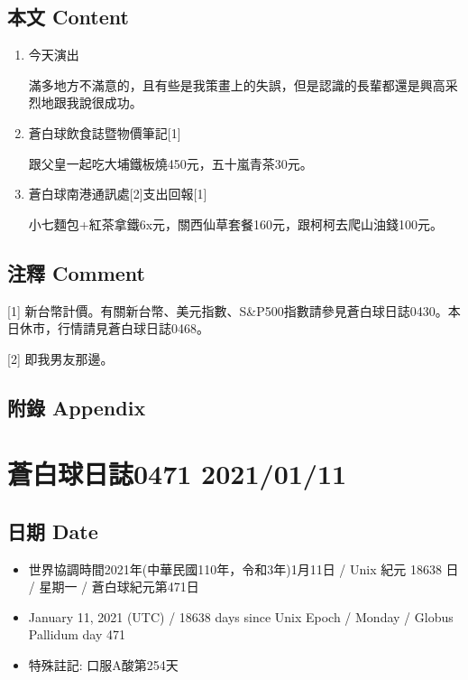 \documentclass[a5paper, 11pt
]{book}
\providecommand{\tightlist}{%
  \setlength{\itemsep}{0pt}\setlength{\parskip}{0pt}}
\begin{document}
\hypertarget{ux672cux6587-content-40}{%
\subsection{本文 Content}\label{ux672cux6587-content-40}}

\begin{enumerate}
\def\labelenumi{\arabic{enumi}.}
\item
  今天演出

  滿多地方不滿意的，且有些是我策畫上的失誤，但是認識的長輩都還是興高采烈地跟我說很成功。
\item
  蒼白球飲食誌暨物價筆記{[}1{]}

  跟父皇一起吃大埔鐵板燒450元，五十嵐青茶30元。
\item
  蒼白球南港通訊處{[}2{]}支出回報{[}1{]}

  小七麵包+紅茶拿鐵6x元，關西仙草套餐160元，跟柯柯去爬山油錢100元。
\end{enumerate}

\hypertarget{ux6ce8ux91cb-comment-40}{%
\subsection{注釋 Comment}\label{ux6ce8ux91cb-comment-40}}

{[}1{]}
新台幣計價。有關新台幣、美元指數、S\&P500指數請參見蒼白球日誌0430。本日休市，行情請見蒼白球日誌0468。

{[}2{]} 即我男友那邊。

\hypertarget{ux9644ux9304-appendix-40}{%
\subsection{附錄 Appendix}\label{ux9644ux9304-appendix-40}}

\hypertarget{ux84bcux767dux7403ux65e5ux8a8c0471-20210111}{%
\section{蒼白球日誌0471
2021/01/11}\label{ux84bcux767dux7403ux65e5ux8a8c0471-20210111}}

\hypertarget{ux65e5ux671f-date-41}{%
\subsection{日期 Date}\label{ux65e5ux671f-date-41}}

\begin{itemize}
\tightlist
\item
  世界協調時間2021年(中華民國110年，令和3年)1月11日 / Unix 紀元 18638 日
  / 星期一 / 蒼白球紀元第471日
\item
  January 11, 2021 (UTC) / 18638 days since Unix Epoch / Monday / Globus
  Pallidum day 471
\item
  特殊註記: 口服A酸第254天
\end{itemize}
\end{document}

